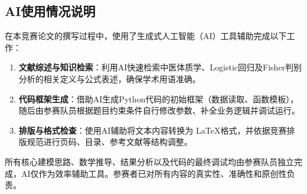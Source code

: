 \documentclass[a4paper,12pt]{ctexart}
\begin{document}










\subsection{AI使用情况说明}

在本竞赛论文的撰写过程中，使用了生成式人工智能（AI）工具辅助完成以下工作：

\begin{enumerate}
    \item \textbf{文献综述与知识检索}：利用AI快速检索中医体质学、Logistic回归及Fisher判别分析的相关定义与公式表述，确保学术用语准确。
    \item \textbf{代码框架生成}：借助AI生成Python代码的初始框架（数据读取、函数模板），随后由参赛队员根据题目约束条件自行修改参数、补全业务逻辑并调试运行。
    \item \textbf{排版与格式检查}：使用AI辅助将文本内容转换为 \LaTeX 格式，并依据竞赛排版规范进行页码、目录、参考文献等结构调整。
\end{enumerate}

所有核心建模思路、数学推导、结果分析以及代码的最终调试均由参赛队员独立完成，AI仅作为效率辅助工具。参赛者已对所有内容的真实性、准确性和原创性负责。
\end{document}
